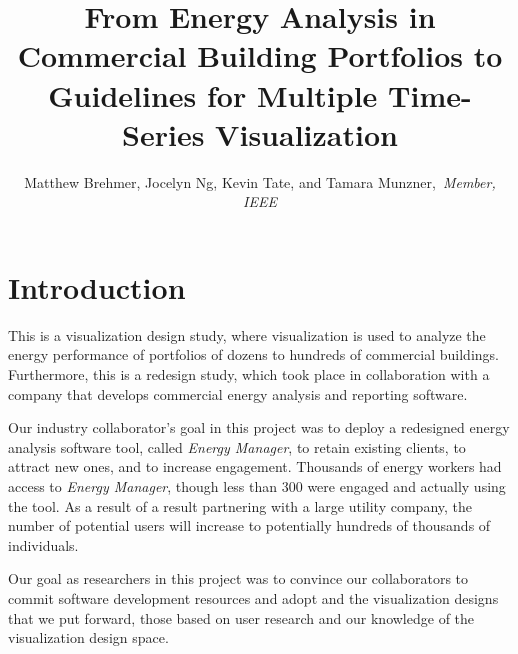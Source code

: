 \documentclass[journal]{vgtc}                %
\title{From Energy Analysis in Commercial Building Portfolios to Guidelines for Multiple Time-Series Visualization}
\author{Matthew Brehmer, Jocelyn Ng, Kevin Tate, and Tamara Munzner,~\textit{Member, IEEE}}
\begin{document}

\maketitle



\section{Introduction}
\label{introduction}


This is a visualization design study, where visualization is used to analyze the energy performance of portfolios of dozens to hundreds of commercial buildings. 
Furthermore, this is a redesign study, which took place in collaboration with a company that develops commercial energy analysis and reporting software.

Our industry collaborator's goal in this project was to deploy a redesigned energy analysis software tool, called {\it Energy Manager}, to retain existing clients, to attract new ones, and to increase engagement. 
Thousands of energy workers had access to {\it Energy Manager}, though less than 300 were engaged and actually using the tool. 
As a result of a result partnering with a large utility company, the number of potential users will increase to potentially hundreds of thousands of individuals.

Our goal as researchers in this project was to convince our collaborators to commit software development resources and adopt and the visualization designs that we put forward, those based on user research and our knowledge of the visualization design space.
\end{document}
